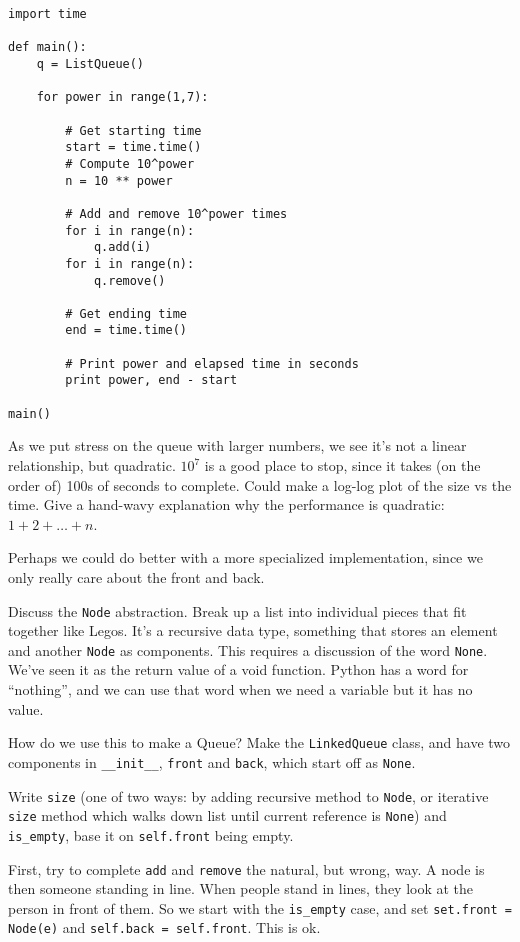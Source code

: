 \documentclass{article}
\begin{document}
\begin{verbatim}
import time

def main():
    q = ListQueue()

    for power in range(1,7):

        # Get starting time
        start = time.time()
        # Compute 10^power
        n = 10 ** power

        # Add and remove 10^power times
        for i in range(n):
            q.add(i)
        for i in range(n):
            q.remove()

        # Get ending time
        end = time.time()

        # Print power and elapsed time in seconds
        print power, end - start

main()
\end{verbatim}

As we put stress on the queue with larger numbers, we see it's not a
linear relationship, but quadratic. $10^7$ is a good place to stop,
since it takes (on the order of) 100s of seconds to complete.  Could
make a log-log plot of the size vs the time.  Give a hand-wavy
explanation why the performance is quadratic: $1 + 2 + \dots + n$.

Perhaps we could do better with a more specialized implementation,
since we only really care about the front and back.

Discuss the \verb|Node| abstraction. Break up a list into individual
pieces that fit together like Legos. It's a recursive data type,
something that stores an element and another \verb|Node| as
components.  This requires a discussion of the word \verb|None|. We've
seen it as the return value of a void function. Python has a word for
``nothing'', and we can use that word when we need a variable but it has
no value.

How do we use this to make a Queue? Make the \verb|LinkedQueue| class,
and have two components in \verb|__init__|, \verb|front| and
\verb|back|, which start off as \verb|None|.

Write \verb|size| (one of two ways: by adding recursive method to
\verb|Node|, or iterative \verb|size| method which walks down list
until current reference is \verb|None|) and \verb|is_empty|, base it
on \verb|self.front| being empty.

First, try to complete \verb|add| and \verb|remove| the natural, but
wrong, way. A node is then someone standing in line. When people stand
in lines, they look at the person in front of them. So we start with
the \verb|is_empty| case, and set \verb|set.front = Node(e)| and
\verb|self.back = self.front|. This is ok.
\end{document}
